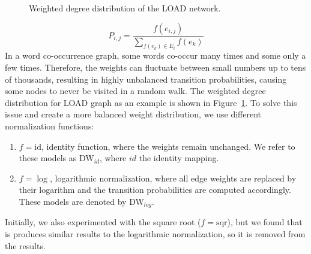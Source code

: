 \begin{figure}
\centering 
\resizebox{0.6\textwidth}{0.6\textwidth}{      

}
\caption{Weighted degree distribution of the LOAD network.}
\label{fig:degrees}
\end{figure}
\begin{equation}
P_{i,j}=\frac{f(e_{i,j})}{\sum _{ f(e_ k )\in E_{ i } }^{  }{ f(e_k) } }
\label{eq:edge_weight}
\end{equation}
In a word co-occurrence graph, some words co-occur many times and some only a few times. Therefore, the weights can fluctuate between small numbers up to tens of thousands, resulting in highly unbalanced transition probabilities, causing some nodes to never be visited in a random walk. The weighted degree distribution for LOAD graph as an example is shown in Figure~\ref{fig:degrees}. To solve this issue and create a more balanced weight distribution, we use different normalization functions:
\noindent
\begin{enumerate}
\item  $f=\mathrm{id}$, identity function, where the weights remain unchanged. We refer to these models as DW$_{id}$, where $id$  the identity mapping.
\item  $f=\log$, logarithmic normalization, where all edge weights are replaced by their logarithm and the transition probabilities are computed accordingly. These models are denoted by DW$_{log}$.
\end{enumerate}
Initially, we also experimented with the square root ($f=\mathrm{sqr}$), but we found that is produces similar results to the logarithmic normalization, so it is removed from the results.\\

